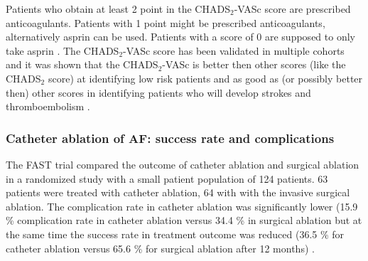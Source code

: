\documentclass[type=dr, dr=rernat, accentcolor=tud7b,colorbacktitle, bigchapter, openright, twoside, 12pt ]{tudthesis}
\begin{document}
Patients who obtain at least 2 point in the CHADS$_{2}$-VASc score are prescribed anticoagulants. Patients with 1 point might be prescribed 
anticoagulants, alternatively asprin can be used. Patients with a score of 0 are supposed to only take asprin \cite{Fle}. The 
CHADS$_{2}$-VASc score has been validated in multiple cohorts \cite{Lip11} and it was shown that the CHADS$_{2}$-VASc is better then other 
scores (like the CHADS$_{2}$ score) at identifying low risk patients \cite{Pot12} \cite{Ole12} \cite{Van11} and as good as (or possibly 
better then) other scores in identifying patients who will develop strokes and thromboembolism \cite{Fri12} \cite{Ole11} \cite{Bor11}. 



\subsubsection*{Catheter ablation of AF: success rate and complications}

The FAST trial compared the outcome of catheter ablation and surgical ablation in a randomized study with a small patient population of 124 
patients. 63 patients were treated with catheter ablation, 64 with with the invasive surgical ablation. 
The complication rate in catheter ablation was significantly lower (15.9 \% complication rate in catheter ablation versus 34.4 \% in surgical 
ablation
but at the same time 
the success rate in treatment outcome was reduced (36.5 \% for catheter ablation versus 65.6 \% for surgical ablation after 
12 months) \cite{Boe12}. \newline
\end{document}
